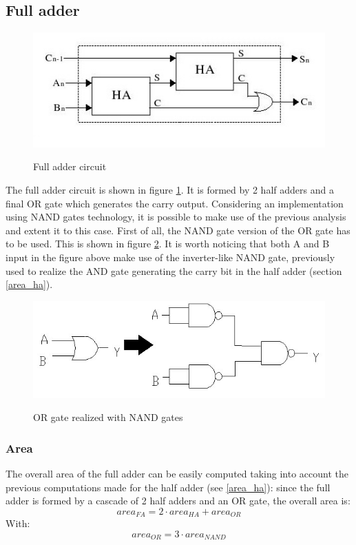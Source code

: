 \subsection{Full adder}
\begin{figure}[htbp]
	\caption{Full adder circuit}
	\includegraphics{img/Figura_FA.jpg}
	\centering
	\label{full_adder}
\end{figure}
The full adder circuit is shown in figure \ref{full_adder}. It is formed by 2 half adders and a final OR gate which generates the carry output. Considering an implementation using NAND gates technology, it is possible to make use of the previous analysis and extent it to this case. First of all, the NAND gate version of the OR gate has to be used. This is shown in figure \ref{or_to_nand}. It is worth noticing that both A and B input in the figure above make use of the inverter-like NAND gate, previously used to realize the AND gate generating the carry bit in the half adder (section \ref{area_ha}).
\begin{figure}[h]
	\caption{OR gate realized with NAND gates}
	\includegraphics{img/or_to_nand.png}
	\centering
	\label{or_to_nand}
\end{figure}
\subsubsection{Area}
The overall area of the full adder can be easily computed taking into account the previous computations made for the half adder (see \ref{area_ha}): since the full adder is formed by a cascade of 2 half adders and an OR gate, the overall area is:
\begin{equation}
area_{FA} = 2\cdot area_{HA} + area_{OR}
\end{equation}
With:
\begin{equation}
area_{OR} = 3\cdot area_{NAND}
\end{equation}
